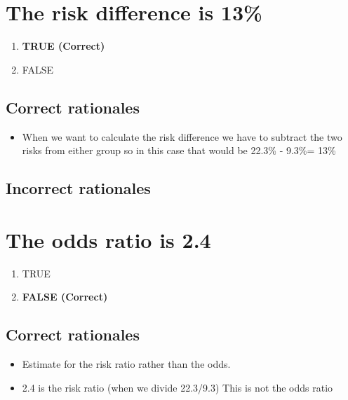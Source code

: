 \documentclass[letterpaper,9pt,twoside,printwatermark=false]{pinp}
\providecommand{\tightlist}{%
  \setlength{\itemsep}{0pt}\setlength{\parskip}{0pt}}
\begin{document}
\section{The risk difference is 13\%}\label{the-risk-difference-is-13}

\begin{enumerate}
\def\labelenumi{\alph{enumi}.}
\tightlist
\item
  \textbf{TRUE (Correct)}
\item
  FALSE
\end{enumerate}

\subsection{Correct rationales}\label{correct-rationales}

\begin{itemize}
\tightlist
\item
  When we want to calculate the risk difference we have to subtract the
  two risks from either group so in this case that would be 22.3\% -
  9.3\%= 13\%
\end{itemize}

\subsection{Incorrect rationales}\label{incorrect-rationales}

\section{The odds ratio is 2.4}\label{the-odds-ratio-is-2.4}

\begin{enumerate}
\def\labelenumi{\alph{enumi}.}
\tightlist
\item
  TRUE
\item
  \textbf{FALSE (Correct)}
\end{enumerate}

\subsection{Correct rationales}\label{correct-rationales-1}

\begin{itemize}
\tightlist
\item
  Estimate for the risk ratio rather than the odds.
\item
  2.4 is the risk ratio (when we divide 22.3/9.3) This is not the odds
  ratio
\end{itemize}
\end{document}
